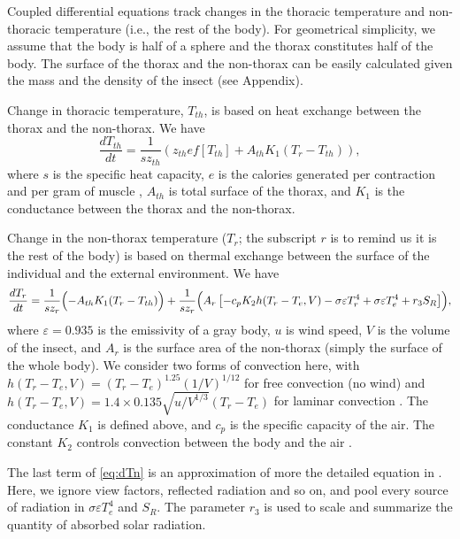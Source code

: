 Coupled differential equations  track changes in the thoracic temperature and non-thoracic temperature (i.e., the rest of the body).
For geometrical simplicity, we assume that the body is half of a sphere and the thorax constitutes half of the body.
The surface of the thorax and the non-thorax can be easily calculated given the mass and the density of the insect (see Appendix).


Change in thoracic temperature, $T_{th}$, is based on heat exchange between the thorax and the non-thorax.
We have 
\begin{equation} \label{eq:dTh}
	\frac{dT_{th}}{dt} = \frac{1}{s z_{th}} (z_{th} e f[T_{th}] +  A_{th} K_1(T_r - T_{th})),
\end{equation}
where $s$ is the specific heat capacity, $e$ is the calories generated per contraction and per gram of muscle \citep{Kammer1974}, $A_{th}$ is total surface of the thorax, and $K_1$ is the conductance between the thorax and the non-thorax.

Change in the  non-thorax temperature ($T_r$; the subscript $r$ is to remind us it is the rest of the body) is based on thermal exchange between the surface of the individual and the external environment. 
We have
\begin{equation} \label{eq:dTn} 
		\frac{dT_r}{dt} =  \frac{1}{s z_{r}} \Bigl( - A_{th} K_1(T_r - T_{th})  \Bigr)
			+ \frac{1}{s z_{r}} \Bigl( A_r \left[ - c_p K_2 h(T_r -T_e, V)- \sigma \varepsilon T_r^4 + \sigma \varepsilon T_e^4  + r_3 S_R  \right] \Bigr),
\end{equation}
where $\varepsilon = 0.935$ is the emissivity of a gray body, $u$ is wind speed, $V$ is the volume of the insect, and $A_r$ is the surface area of the non-thorax (simply the surface of the whole body).
We consider two forms of convection here, with $ h(T_r -T_e, V) = (T_r- T_e)^{1.25} (1/V)^{1/12 }$ for free convection (no wind) and $ h(T_r -T_e, V) =  1.4 \times 0.135 \sqrt{u/V^{1/3}} (T_r- T_e) $ for laminar convection \citep{Campbell2012}.
%
The conductance $K_1$ is defined above, and $c_p$ is the specific capacity of the air.
The constant $K_2$ controls convection between the body and the air \citep{Campbell2012}.

The last term of \cref{eq:dTn}  is an approximation of more the detailed equation in \citet{Campbell2012}.
Here, we ignore view factors, reflected radiation and so on, and pool every source of radiation in $ \sigma \varepsilon T_e^4$ and $S_R$. 
The parameter $r_3$ is used to scale and summarize the quantity of absorbed solar radiation.

